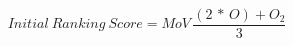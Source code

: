 \documentclass[12pt]{minimal}
\begin{document}
\[Initial\:Ranking\:Score=MoV\,\frac{(2\,*\,O)+O_2}{3}\]
\end{document}
